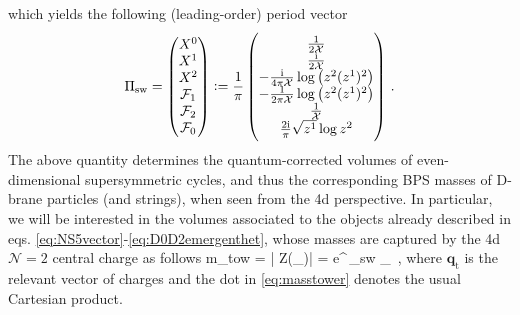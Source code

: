 \eeq
%
which yields the following (leading-order) period vector 
%
\begin{equation} \label{eq:periodvectorSW}
    \Pi_{\rm sw} = \begin{pmatrix}
    X^0 \\
           X^1 \\
           X^2\\
           \mathcal{F}_1 \\
           \mathcal{F}_2\\
           \mathcal{F}_0
\end{pmatrix} := \frac{1}{\pi} \begin{pmatrix}
    \frac{1}{2\mathcal{X}}\\
    \frac{\text{i}}{2\mathcal{X}} \\
    -\frac{\text{i}}{4 \pi \mathcal{X}} \log \left(z^2 (z^1)^2 \right) \\
   -\frac{1}{2 \pi \mathcal{X}} \log \left(z^2 (z^1)^2 \right)\\
   \frac{1}{\mathcal{X}}\\
   \frac{2\text{i}}{\pi} \sqrt{z^1} \log z^2
\end{pmatrix}\, .
\end{equation}
%
The above quantity determines the quantum-corrected volumes of even-dimensional supersymmetric cycles, and thus the corresponding BPS masses of D-brane particles (and strings), when seen from the 4d perspective. In particular, we will be interested in the volumes associated to the objects already described in eqs. \eqref{eq:NS5vector}-\eqref{eq:D0D2emergenthet}, whose masses are captured by the 4d $\mathcal{N}=2$ central charge as follows
%
\beq \label{eq:masstower}
	m_{\rm tow} = \left| Z(_{})\right| = \sqrt{8\pi} e^{}\,\mathbf{\Pi}_{\rm sw} \cdot {}_{}\, ,
\eeq
%
where $\mathbf{q}_{\text{t}}$ is the relevant vector of charges and the dot in \eqref{eq:masstower} denotes the usual Cartesian product.

